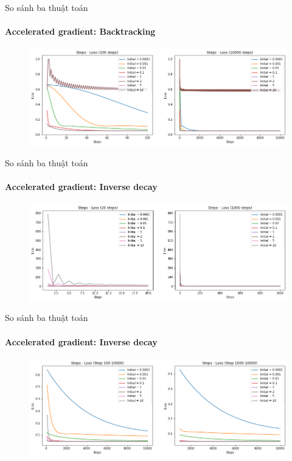 \documentclass[10pt]{beamer}
\theoremstyle{remark}
\theoremstyle{definition}
\begin{document}
\begin{frame}{So sánh ba thuật toán}
	\framesubtitle{Accelerated gradient: Backtracking}
	\begin{figure}[h!]
		\centering
		\includegraphics[width=12cm]{Thinh/18.png}
	\end{figure}
\end{frame}

\begin{frame}{So sánh ba thuật toán}
	\framesubtitle{Accelerated gradient: Inverse decay}
	\begin{figure}[h!]
		\centering
		\includegraphics[width=12cm]{Thinh/19.png}
	\end{figure}

\end{frame}

\begin{frame}{So sánh ba thuật toán}
	\framesubtitle{Accelerated gradient: Inverse decay}
	\begin{figure}[h!]
		\centering
		\includegraphics[width=12cm]{Thinh/20.png}
	\end{figure}

\end{frame}
\end{document}
